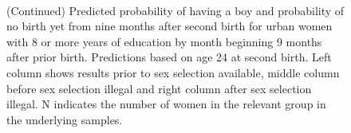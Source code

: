 \documentclass[12pt,letterpaper]{article}
\begin{document}
\begin{figure}[htpb]
{\begin{minipage}{0.31\textwidth}
        \captionsetup[subfigure]{labelformat=empty,position=top,captionskip=-1pt,farskip=-0.5pt}
        \\
        \captionsetup[subfigure]{labelformat=parens}
    \end{minipage}
}
\setcounter{subfigure}{6}
\caption{(Continued) Predicted probability of having a boy and probability of
no birth yet from nine months after second birth for urban 
women with 8 or more years of education by month beginning 9 months after prior birth. 
Predictions based on age 24 at second birth.
Left column shows results prior to sex selection available, middle column before
sex selection illegal and right column after sex selection illegal.
N indicates the number of women in the relevant group in the underlying samples.
}
\end{figure}
\end{document}
